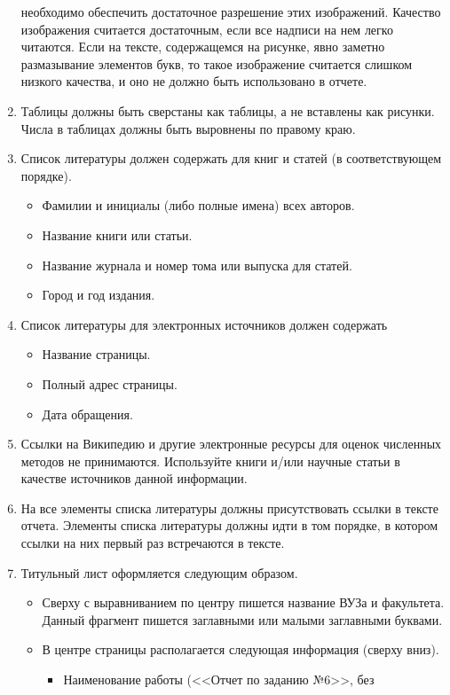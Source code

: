 \documentclass[a4paper,12pt,titlepage,final]{article}
\begin{document}
\begin{enumerate}
	необходимо обеспечить достаточное разрешение этих изображений. Качество
	изображения считается достаточным, если все надписи на нем легко
	читаются. Если на тексте, содержащемся на рисунке, явно заметно
	размазывание элементов букв, то такое изображение считается слишком
	низкого качества, и оно не должно быть использовано в отчете.
    \item Таблицы должны быть сверстаны как таблицы, а не вставлены как рисунки.
	Числа в таблицах должны быть выровнены по правому краю.
    \item Список литературы должен содержать для книг и статей (в
	соответствующем порядке).
	\begin{itemize}
	    \item Фамилии и инициалы (либо полные имена) всех авторов.
	    \item Название книги или статьи.
	    \item Название журнала и номер тома или выпуска для статей.
	    \item Город и год издания.
	\end{itemize}
    \item Список литературы для электронных источников должен содержать
	\begin{itemize}
	    \item Название страницы.
	    \item Полный адрес страницы.
	    \item Дата обращения.
	\end{itemize}
    \item Ссылки на Википедию и другие электронные ресурсы для оценок численных
	методов не принимаются. Используйте книги и/или научные статьи в
	качестве источников данной информации.
    \item На все элементы списка литературы должны присутствовать ссылки в
	тексте отчета. Элементы списка литературы должны идти в том порядке, в
	котором ссылки на них первый раз встречаются в тексте.
    \item Титульный лист оформляется следующим образом.
	\begin{itemize}
	    \item Сверху с выравниванием по центру пишется название ВУЗа и
		факультета. Данный фрагмент пишется заглавными или малыми
		заглавными буквами.
	    \item В центре страницы располагается следующая информация (сверху вниз).
		\begin{itemize}
		    \item Наименование работы (<<Отчет по заданию №6>>, без

\end{itemize}
\end{itemize}
\end{enumerate}
\end{document}
